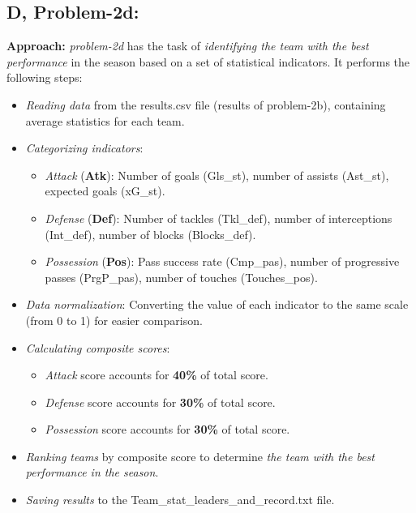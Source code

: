 \documentclass[12pt]{article}
\begin{document}
\subsection*{D, Problem-2d:}

\textbf{Approach:} \textit{problem-2d} has the task of \textit{identifying the team with the best performance} in the season based on a set of statistical indicators. It performs the following steps:

\begin{itemize}
    \item \textit{Reading data} from the results.csv file (results of problem-2b), containing average statistics for each team.
    \item \textit{Categorizing indicators}:
    
    \begin{itemize}
        \item \textit{Attack} (\textbf{Atk}): Number of goals (Gls\_st), number of assists (Ast\_st), expected goals (xG\_st).
        \item \textit{Defense} (\textbf{Def}): Number of tackles (Tkl\_def), number of interceptions (Int\_def), number of blocks (Blocks\_def).
        \item \textit{Possession} (\textbf{Pos}): Pass success rate (Cmp\_pas), number of progressive passes (PrgP\_pas), number of touches (Touches\_pos).
    \end{itemize}
    
    \item \textit{Data normalization}: Converting the value of each indicator to the same scale (from 0 to 1) for easier comparison.
    \item \textit{Calculating composite scores}:
    
    \begin{itemize}
        \item \textit{Attack} score accounts for \textbf{40\%} of total score.
        \item \textit{Defense} score accounts for \textbf{30\%} of total score.
        \item \textit{Possession} score accounts for \textbf{30\%} of total score.
    \end{itemize}
    
    \item \textit{Ranking teams} by composite score to determine \textit{the team with the best performance in the season}.
    \item \textit{Saving results} to the Team\_stat\_leaders\_and\_record.txt file.
\end{itemize}
\end{document}
